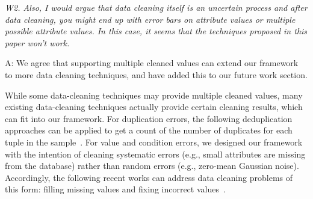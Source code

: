 


\mbox{}

\emph{W2. Also, I would argue that data cleaning itself is an uncertain process and after data cleaning, you might end up with error bars on attribute values or multiple possible attribute values. In this case, it seems that the techniques proposed in this paper won't work.}


A: We agree that supporting multiple cleaned values can extend our framework to more data cleaning techniques, and have added this to our future work section. 

While some data-cleaning techniques may provide multiple cleaned values, many existing data-cleaning techniques actually provide certain cleaning results, which can fit into our framework. For duplication errors, the following deduplication approaches can be applied to get a count of the number of duplicates for each tuple in the sample~\cite{elfeky2002tailor, conf/hdkm/Christen08, DBLP:conf/kdd/BilenkoM03, benjelloun2009swoosh}. 
For value and condition errors, we designed our framework with the intention of cleaning systematic errors (e.g., small attributes are missing from the database) rather than random errors (e.g., zero-mean Gaussian noise). 
Accordingly, the following recent works can address data cleaning problems of this form: filling missing values \cite{conf/icde/BethTMP13, parkcrowdfill} and fixing incorrect values~\cite{DBLP:journals/pvldb/YakoutENOI11, fan2012foundations,DBLP:conf/sigmod/DallachiesaEEEIOT13}. 



